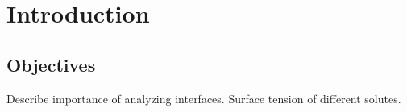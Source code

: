 \chapter{Introduction}

\section{Objectives}

Describe importance of analyzing interfaces. Surface tension of different
solutes.